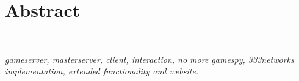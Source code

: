 \chapter*{Abstract}
\\

\begin{comment}
The masterserver is a software server that receives data from online multiplayer game servers and presents a list of all online multiplayer game servers to the users/gamers. This is often a commercial service provided by various game developers and/or software enterprises. When the largest master server provider permanently went offline in 2014, support for a number of online multiplayer games was dropped.

Various implementations of the masterserver concept were written by corporate parties and have been kept closed-source. To fully support all online games that were affected by the GameSpy shutdown, an alternate masterserver should become available, controlled by the community, for the community. Eventually, the thought of an all-powerful community masterserver starts with the writing and availability of the software as described in this document.\\
\\
\end{comment}
\emph{gameserver, masterserver, client, interaction, no more gamespy, 333networks implementation, extended functionality and website.}
